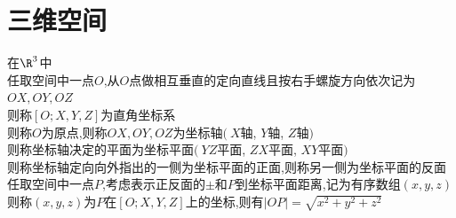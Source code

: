 

%

\setcounter{section}{0}
\setcounter{subsection}{0}

\chapter{三维空间}

\begin{dingyi}
在$\R^3$中\\
任取空间中一点$O$,从$O$点做相互垂直的定向直线且按右手螺旋方向依次记为$OX,OY,OZ$\\
则称$[O;X,Y,Z]$为直角坐标系\\
则称$O$为原点,则称$OX,OY,OZ$为坐标轴$(\ $$X$轴, $Y$轴, $Z$轴$)$\\
则称坐标轴决定的平面为坐标平面$(\ $$YZ$平面, $ZX$平面, $XY$平面$)$\\
则称坐标轴定向向外指出的一侧为坐标平面的正面,则称另一侧为坐标平面的反面\\
任取空间中一点$P$,考虑表示正反面的$\pm$和$P$到坐标平面距离,记为有序数组$(x,y,z)$\\
则称$(x,y,z)$为$P$在$[O;X,Y,Z]$上的坐标,则有$|OP|=\sqrt{x^2+y^2+z^2}$
\begin{center}
\end{center}
\end{dingyi}

